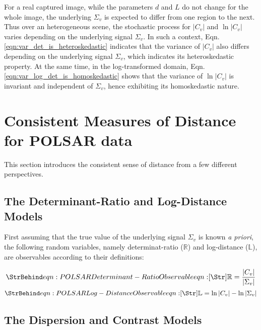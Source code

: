 For a real captured image, while the parameters $d$ and $L$ do not change for the whole image,
  the underlying $\Sigma_v$ is expected to differ from one region to the next.
Thus over an heterogeneous scene, the stochastic process for $|C_v|$ and $\ln |C_v|$ varies depending on the underlying signal $\Sigma_v$. 
In such a context, Eqn. \ref{eqn:var_det_is_heteroskedastic} indicates that the variance of $|C_v|$ also differs depending on the underlying signal $\Sigma_v$, which indicates its heteroskedastic property.
At the same time, in the log-transformed domain, Eqn. \ref{eqn:var_log_det_is_homoskedastic} shows that
  the variance of $\ln |C_v|$ is invariant and independent of $\Sigma_v$, hence exhibiting its homoskedastic nature.

\section{Consistent Measures of Distance for POLSAR data}
\label{sec:consistent_measures_distance_polsar}

This section introduces the consistent sense of distance from a few different perspectives.

\subsection{The Determinant-Ratio and Log-Distance Models}

First assuming that the true value of the underlying signal $\Sigma_v$ is known \textit{a priori},
the following random variables,
  namely determinat-ratio ($\mathbb{R}$) and log-distance ($\mathbb{L}$),
  are observables according to their definitions:

\begin{equation}
 \label{eqn:determinant_ratio_observables}
 \caption{eqn:POLSAR Determinant-Ratio Observable}
 \mathbb{R} = \frac{|C_v|}{|\Sigma_v|}
\end{equation}
\begin{equation}
 \label{eqn:log_distance_observables}
 \caption{eqn:POLSAR Log-Distance Observable}
 \mathbb{L} = \ln|C_v| - \ln|\Sigma_v|  
\end{equation}

\subsection{The Dispersion and Contrast Models}

